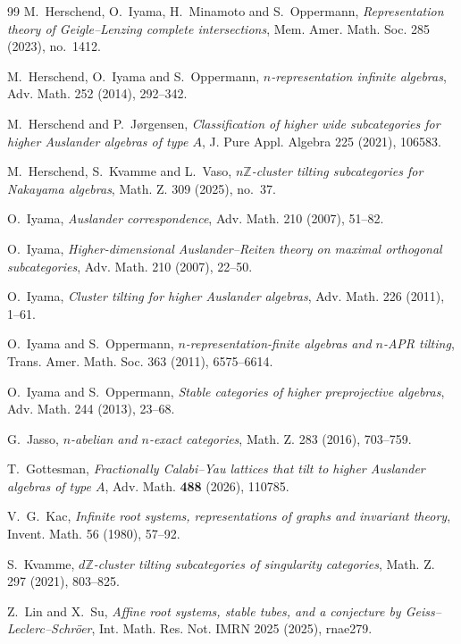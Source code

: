 \documentclass[11pt,a4paper]{amsart}
\theoremstyle{definition}
\numberwithin{equation}{section}
\newcommand{\0}{\mathbf{0}}
\begin{document}
\begin{thebibliography}{99}
		M.~Herschend, O.~Iyama, H.~Minamoto and S.~Oppermann,
		\emph{Representation theory of Geigle--Lenzing complete intersections},
		Mem. Amer. Math. Soc. {285} (2023), no.~1412.
		
		M.~Herschend, O.~Iyama and S.~Oppermann,
		\emph{$n$-representation infinite algebras},
		Adv. Math. {252} (2014), 292--342.
		
		M.~Herschend and P.~J\o rgensen,
		\emph{Classification of higher wide subcategories for higher Auslander
			algebras of type $A$},
		J. Pure Appl. Algebra {225}  (2021), 106583.
		
		M.~Herschend, S.~Kvamme and L.~Vaso,
		\emph{$n\mathbb Z$-cluster tilting subcategories for Nakayama algebras},
		Math. Z. {309} (2025), no.~37.
		
		O.~Iyama,
		\emph{Auslander correspondence},
		Adv. Math. {210}  (2007), 51--82.
		
		O.~Iyama,
		\emph{Higher-dimensional Auslander--Reiten theory on maximal
			orthogonal subcategories},
		Adv. Math. {210}  (2007), 22--50.
		
		O.~Iyama,
		\emph{Cluster tilting for higher Auslander algebras},
		Adv. Math. {226}  (2011), 1--61.
		
		O.~Iyama and S.~Oppermann,
		\emph{$n$-representation-finite algebras and $n$-APR tilting},
		Trans. Amer. Math. Soc. {363}  (2011), 6575--6614.
		
		O.~Iyama and S.~Oppermann,
		\emph{Stable categories of higher preprojective algebras},
		Adv. Math. {244} (2013), 23--68.
		
		G.~Jasso,
		\emph{$n$-abelian and $n$-exact categories},
		Math. Z. {283} (2016), 703--759.
		
		T.~Gottesman,
		\emph{Fractionally Calabi--Yau lattices that tilt to higher
			Auslander algebras of type $A$},
		Adv. Math. \textbf{488} (2026), 110785.
		
		V.~G.~Kac,
		\emph{Infinite root systems, representations of graphs and invariant theory},
		Invent. Math. {56}  (1980), 57--92.
		
		S.~Kvamme,
		\emph{$d\mathbb Z$-cluster tilting subcategories of singularity categories},
		Math. Z. {297}  (2021), 803--825.
		
		Z.~Lin and X.~Su,
		\emph{Affine root systems, stable tubes, and a conjecture by
			Geiss--Leclerc--Schr\"oer},
		Int. Math. Res. Not. IMRN {2025}  (2025), rnae279.
		

\end{thebibliography}
\end{document}
